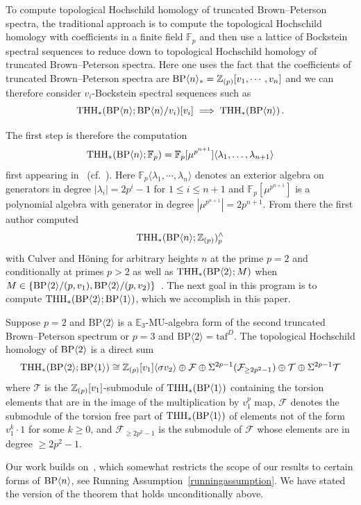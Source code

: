 To compute topological Hochschild homology of truncated Brown--Peterson spectra, the traditional approach is to compute the topological Hochschild homology with coefficients in a finite field $\mathbb{F}_p$ and then use a lattice of Bockstein spectral sequences to reduce down to topological Hochschild homology of truncated Brown--Peterson spectra. Here one uses the fact that the coefficients of truncated Brown--Peterson spectra are $\mathrm{BP}\langle n\rangle_*=\mathbb{Z}_{(p)}[v_1,\cdots ,v_n]$ and we can therefore consider $v_i$-Bockstein spectral sequences such as 
\[ 
\operatorname{THH}_*(\mathrm{BP}\langle n\rangle;\mathrm{BP}\langle n\rangle/v_i)[v_i]\implies \operatorname{THH}_*(\mathrm{BP}\langle n\rangle)\,.
\]

The first step is therefore the computation 
\[ \operatorname{THH}_*(\mathrm{BP}\langle n\rangle;\mathbb{F}_p)=\mathbb{F}_p[\mu^{p^{n+1}}]\langle \lambda_1,\dots ,\lambda_{n+1} \rangle
\]
first appearing in~\cite{ACH24} (cf.~\cite{Ang26}). Here  $\mathbb{F}_p\langle \lambda_1,\cdots ,\lambda_n\rangle$ denotes an exterior algebra on generators in degree $|\lambda_{i}|=2p^i-1$ for $1\le i\le n+1$ and $\mathbb{F}_p[\mu^{p^{n+1}}]$ is a polynomial algebra with generator in degree $|\mu^{p^{n+1}}|=2p^{n+1}$. From there the first author computed 
\[ \operatorname{THH}_*(\mathrm{BP}\langle n\rangle ; \mathbb{Z}_{(p)})_p^{\wedge}\]
with Culver and H\"oning for arbitrary heights $n$ at the prime $p=2$ and conditionally at primes $p>2$ as well as 
$\operatorname{THH}_*(\mathrm{BP}\langle 2\rangle ; M)$
when $M\in \{\mathrm{BP}\langle 2\rangle/(p,v_1),\mathrm{BP}\langle 2\rangle /(p,v_2)\}$~\cite{ACH24}. The next goal in this program is to compute $\operatorname{THH}_*(\mathrm{BP}\langle 2\rangle;\mathrm{BP}\langle 1\rangle)$,
which we accomplish in this paper. 

\begin{thmx}\label{thm:main}
  Suppose $p=2$ and $\mathrm{BP}\langle 2\rangle$ is a $\mathbb{E}_3$-$\mathrm{MU}$-algebra form of the second truncated Brown--Peterson spectrum or $p=3$ and $\mathrm{BP}\langle 2\rangle=\mathrm{taf}^{D}$. 
  The topological Hochschild homology of $\mathrm{BP}\langle 2\rangle$ is a direct sum
  \[
    \operatorname{THH}_*(\mathrm{BP} \langle 2 \rangle ; \mathrm{BP} \langle 1 \rangle) \cong \mathbb{Z}_{(p)}[v_1] \langle \sigma v_2 \rangle \oplus \mathcal{F} \oplus \Sigma^{2p - 1} (\mathcal{F}_{\geq 2p^2 - 1}) \oplus \mathcal{T} \oplus \Sigma^{2p - 1} \mathcal{T}
  \]
  where $\mathcal{T}$ is the $\mathbb{Z}_{(p)}[v_1]$-submodule of $\operatorname{THH}_*(\mathrm{BP} \langle 1 \rangle)$ containing the torsion elements that are in the image of the multiplication by $v_1^p$ map,  $\mathcal{F}$ denotes the submodule of the torsion free part of $\operatorname{THH}_*(\mathrm{BP} \langle 1 \rangle)$ of elements not of the form $v_1^k \cdot 1$ for some $k \geq 0$, and $\mathcal{F}_{\geq 2p^2 -1}$ is the submodule of $\mathcal{F}$ whose elements are in degree $\geq 2p^2 -1$.
\end{thmx}
Our work builds on~\cite[Theorem~3.8]{ACH24}, which somewhat restricts the scope of our results to certain forms of $\mathrm{BP}\langle n\rangle$, see Running Assumption~\ref{runningassumption}. We have stated the version of the theorem that holds unconditionally above. 

